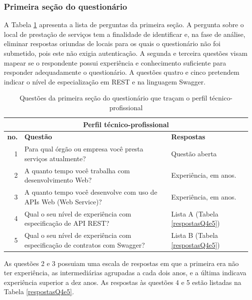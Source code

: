 \subsubsection{Primeira seção do questionário}

A Tabela \ref{Secao1Questionario} apresenta a lista de perguntas da primeira
seção.
A pergunta sobre o local de prestação de serviços tem a finalidade de 
identificar e, na fase de análise, eliminar respostas oriundas de locais para os quais o questionário
não foi submetido, pois este não exigia autenticação. A segunda e terceira
questões visam mapear se o respondente possui experiência e
conhecimento suficiente para responder adequadamente o questionário. A questões
quatro e cinco pretendem indicar o nível de especialização em \wss{} REST e
na linguagem Swagger.

\begin{table}[h]
\scriptsize
\centering
\vspace{0.5cm}
\begin{tabular}{r|p{10cm}|p{3cm}}
\multicolumn{3}{c}{{\normalsize Perfil técnico-profissional}}\\

\hline    
\textbf{no.} & \textbf{Questão} & \textbf{Respostas} \\
\hline    
1 & Para qual órgão ou empresa você presta serviços atualmente? & Questão aberta
\\
2 & A quanto tempo você trabalha com desenvolvimento Web? & Experiência, em
anos.\\
3 & A quanto tempo você desenvolve com uso de APIs Web (Web Service)? & Experiência, em
anos.\\
4 & Qual o seu nível de experiência com especificação de API REST? & Lista A
(Tabela \ref{respostasQ4e5}) \\
5 & Qual o seu nível de experiência com especificação de contratos com Swagger?
& Lista B (Tabela \ref{respostasQ4e5})\\

\end{tabular}
\caption{Questões da primeira seção do questionário que traçam o perfil
técnico-profissional}
\label{Secao1Questionario}
\end{table}

As questões 2 e 3 possuiam uma escala de respostas em que a primeira era
não ter experiência, as intermediárias agrupadas a cada dois
anos, e a última indicava experiência superior a dez anos. As respostas às
questões 4 e 5 estão listadas na Tabela \ref{respostasQ4e5}.

